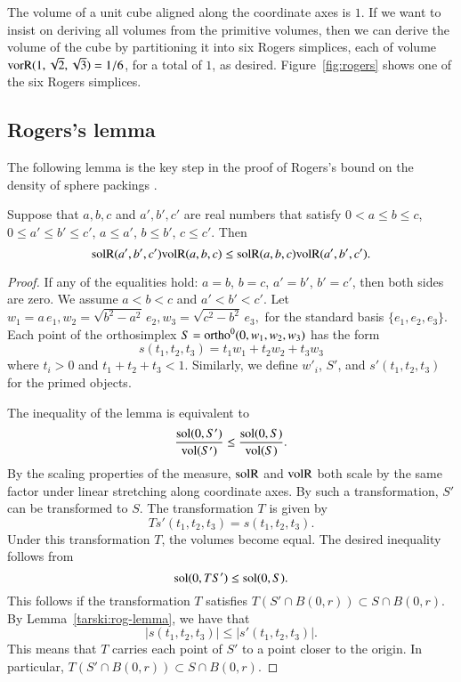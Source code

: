 \begin{remark}
The volume of a unit cube aligned along the coordinate axes is $1$.  
If we want to insist on deriving all volumes from the primitive
volumes, then we can derive the volume of the cube by partitioning
it into six Rogers simplices,
each of volume ${\operatorname{vorR}}(1,\sqrt2,\sqrt3) = 1/6$, for a total
of $1$, as desired.  Figure~\ref{fig:rogers} shows one of the six
Rogers simplices.
\end{remark}



\subsection{Rogers's lemma}


The following lemma is the key step in the proof of Rogers's
bound on the density of sphere packings \cite{Rog58}.

\begin{lemma} 
Suppose that $a,b,c$ and $a',b',c'$
are real numbers that satisfy $0 <a \le b \le c$, $0 \le a'\le b'\le c'$,
$a \le a'$, $b \le b'$, $c \le c'$. Then
  $$
  {\operatorname{solR}}(a',b',c'){\operatorname{volR}}(a,b,c) \le {\operatorname{solR}}(a,b,c){\operatorname{volR}}(a',b',c').
  $$
\end{lemma}

\begin{proof} If any of the equalities hold: $a=b$, $b=c$, $a'=b'$,
$b'=c'$, then both sides are zero.  We assume $a<b<c$ and $a'<b'<c'$.
Let $w_1=a\,e_1,w_2=\sqrt{b^2-a^2}\, e_2,w_3=\sqrt{c^2-b^2}\, e_3,$
for the standard basis $\{e_1,e_2,e_3\}$.  Each point of the orthosimplex
$S = {\operatorname{ortho}}^0(0,w_1,w_2,w_3)$ has
the form
   $$s(t_1,t_2,t_3) = t_1 w_1 + t_2 w_2 + t_3 w_3$$
where $t_i>0$ and $t_1+t_2+t_3< 1$.  Similarly,
we define $w'_i$, $S'$, and $s'(t_1,t_2,t_3)$ for the primed objects.

The inequality of the lemma is equivalent to
  $$
  \frac{\operatorname{sol}(0,S')}{{\operatorname{vol}}(S')} \le \frac{\operatorname{sol}(0,S)}{{\operatorname{vol}}(S)}.
  $$
By the scaling properties of the measure, ${\operatorname{solR}}$ and ${\operatorname{volR}}$ both
scale by the same factor under linear stretching along coordinate axes.
By such a transformation, $S'$ can be transformed to $S$.  The
transformation $T$ is given by 
   $$
   T s'(t_1,t_2,t_3) = s(t_1,t_2,t_3).
   $$
Under this transformation $T$, the volumes become equal.
The desired inequality follows from
   $$
   \operatorname{sol}(0,T S') \le \operatorname{sol}(0,S).
   $$
This follows if the transformation $T$ satisfies
   $T(S'\cap B(0,r))\subset S\cap B(0,r)$.
By Lemma~\ref{tarski:rog-lemma}, we have that 
   $$|s(t_1,t_2,t_3)|\le |s'(t_1,t_2,t_3)|.$$
This means that $T$ carries each point of $S'$ to a point closer to
the origin.  In particular,
  $T(S'\cap B(0,r))\subset S\cap B(0,r)$.
\end{proof}

